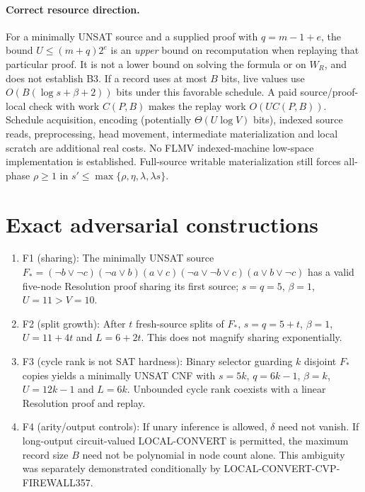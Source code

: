 \documentclass[11pt]{article}
\begin{document}
\paragraph{Correct resource direction.}
For a minimally UNSAT source and a supplied proof with $q=m-1+e$, the bound $U\le(m+q)2^e$ is an \emph{upper} bound on recomputation when replaying that particular proof. It is not a lower bound on solving the formula or on $W_R$, and does not establish B3. If a record uses at most $B$ bits, live values use $O(B(\log s+\beta+2))$ bits under this favorable schedule. A paid source/proof-local check with work $C(P,B)$ makes the replay work $O(U C(P,B))$. Schedule acquisition, encoding (potentially $\Theta(U\log V)$ bits), indexed source reads, preprocessing, head movement, intermediate materialization and local scratch are additional real costs. No FLMV indexed-machine low-space implementation is established. Full-source writable materialization still forces all-phase $\rho\ge1$ in $s'\le\max\{\rho,\eta,\lambda,\lambda s\}$.

\section*{Exact adversarial constructions}
\begin{enumerate}
\item[] F1 (sharing): The minimally UNSAT source
$F_*=(\neg b\vee\neg c)(\neg a\vee b)(a\vee c)(\neg a\vee\neg b\vee c)(a\vee b\vee\neg c)$
has a valid five-node Resolution proof sharing its first source; $s=q=5$, $\beta=1$, $U=11>V=10$.
\item[] F2 (split growth): After $t$ fresh-source splits of $F_*$, $s=q=5+t$, $\beta=1$, $U=11+4t$ and $L=6+2t$. This does not magnify sharing exponentially.
\item[] F3 (cycle rank is not SAT hardness): Binary selector guarding $k$ disjoint $F_*$ copies yields a minimally UNSAT CNF with $s=5k$, $q=6k-1$, $\beta=k$, $U=12k-1$ and $L=6k$. Unbounded cycle rank coexists with a linear Resolution proof and replay.
\item[] F4 (arity/output controls): If unary inference is allowed, $\delta$ need not vanish. If long-output circuit-valued LOCAL-CONVERT is permitted, the maximum record size $B$ need not be polynomial in node count alone. This ambiguity was separately demonstrated conditionally by LOCAL-CONVERT-CVP-FIREWALL357.
\end{enumerate}
\end{document}
